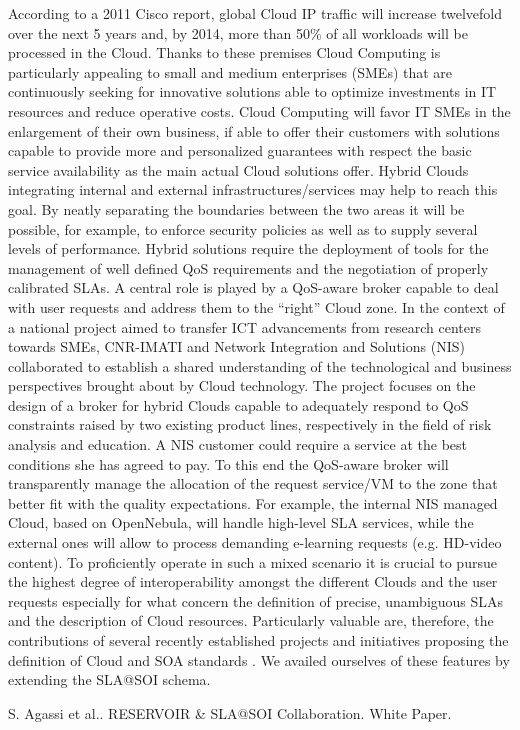 According to a 2011 Cisco report, global Cloud IP traffic will increase twelvefold over the next 5 years and, by 2014, more than 50\% of all workloads will be processed in the Cloud. Thanks to these premises Cloud Computing is particularly appealing to small and medium enterprises (SMEs) that are continuously seeking for innovative solutions able to optimize investments in IT resources and reduce operative costs. 
Cloud Computing will favor IT SMEs in the enlargement of their own business,  if able to offer their customers with solutions capable to provide more and personalized guarantees with respect the basic service availability as the  main actual Cloud solutions offer.
Hybrid Clouds integrating internal  and external infrastructures/services may help to reach this goal. By neatly separating the boundaries between the two areas it will be possible, for example, to enforce security policies as well as to supply several levels of performance. Hybrid solutions require the deployment of tools for the management of well defined QoS requirements and the negotiation of properly calibrated SLAs. A central role is played by a QoS-aware broker capable to deal with user requests and address them to the ``right'' Cloud zone.
In the context of a national project aimed to transfer ICT advancements from research centers towards SMEs, CNR-IMATI and Network Integration and Solutions (NIS) collaborated to establish a shared understanding of the technological and business perspectives brought about by Cloud technology.  The project focuses on the design of a broker for hybrid Clouds capable to adequately respond to QoS constraints raised by two existing product lines, respectively in the field of risk analysis and education. A NIS customer could require a service at the best conditions she has agreed to pay. To this end the QoS-aware broker will transparently manage the allocation of the request service/VM to the zone that better fit with the quality expectations. For example, the internal NIS managed Cloud, based on OpenNebula, will handle high-level SLA services, while the external ones will allow to process demanding e-learning  requests (e.g. HD-video content).
To proficiently operate in such a mixed scenario it is crucial to pursue the highest degree of interoperability amongst the different Clouds and the user requests especially for what concern the definition of precise, unambiguous SLAs and the description of Cloud resources. Particularly valuable are, therefore, the contributions of several recently established projects and initiatives proposing the definition of Cloud and SOA standards \cite{WP}.  We availed ourselves of these features by extending the SLA@SOI schema.


\begin{thebibliography}{10}

{\sc S. Agassi et al.}. {RESERVOIR \& SLA@SOI Collaboration}. White Paper.

\end{thebibliography}
